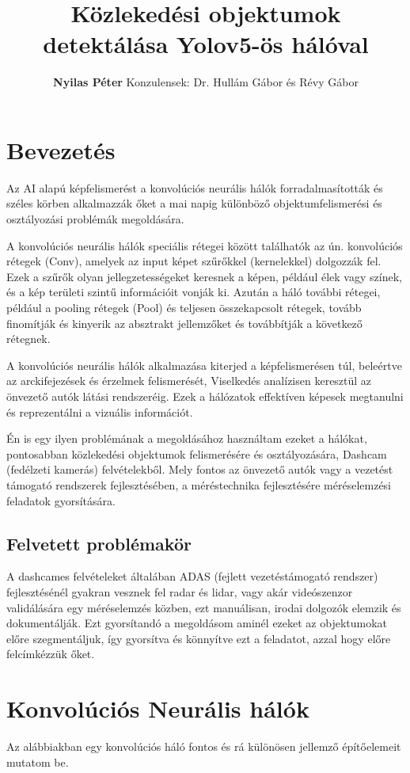 \documentclass{article}
\title{Közlekedési objektumok detektálása Yolov5-ös hálóval}
\author{\textbf{Nyilas Péter}
Konzulensek:
Dr. Hullám Gábor és
Révy Gábor}
\begin{document}
\maketitle



\section{Bevezetés}

Az AI alapú képfelismerést a konvolúciós neurális hálók forradalmasították és széles körben alkalmazzák őket a mai napig különböző objektumfelismerési és osztályozási problémák megoldására.

A konvolúciós neurális hálók speciális rétegei között találhatók az ún. konvolúciós rétegek (Conv), amelyek az input képet szűrőkkel (kernelekkel) dolgozzák fel. Ezek a szűrők olyan jellegzetességeket keresnek a képen, például élek vagy színek, és a kép területi szintű információit vonják ki. Azután a háló további rétegei, például a pooling rétegek (Pool) és teljesen összekapcsolt rétegek, tovább finomítják és kinyerik az absztrakt jellemzőket és továbbítják a következő rétegnek.


A konvolúciós neurális hálók alkalmazása kiterjed a képfelismerésen túl, beleértve az arckifejezések és érzelmek felismerését, Viselkedés analízisen keresztül az önvezető autók látási rendszeréig. Ezek a hálózatok effektíven képesek megtanulni és reprezentálni a vizuális információt.


Én is egy ilyen problémának a megoldásához használtam ezeket a hálókat, pontosabban közlekedési objektumok felismerésére és osztályozására, Dashcam (fedélzeti kamerás) felvételekből. 
Mely fontos az önvezető autók vagy a vezetést támogató rendszerek fejlesztésében, a méréstechnika fejlesztésére méréselemzési feladatok gyorsítására.

\subsection{Felvetett problémakör}
A dashcames felvételeket általában ADAS (fejlett vezetéstámogató rendszer) fejlesztésénél gyakran vesznek fel radar és lidar, vagy akár videószenzor validálására egy méréselemzés közben, ezt manuálisan, irodai dolgozók elemzik és dokumentálják. Ezt gyorsítandó a megoldásom aminél ezeket az objektumokat előre szegmentáljuk, így gyorsítva és könnyítve ezt a feladatot, azzal hogy előre felcímkézzük őket.

\section{Konvolúciós Neurális hálók}
Az alábbiakban egy konvolúciós háló fontos és rá különösen jellemző építőelemeit mutatom be.
\end{document}
